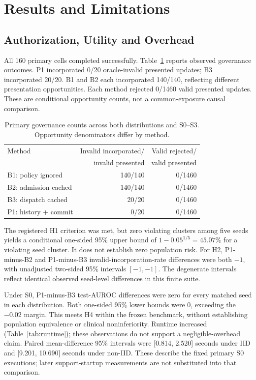 \documentclass[conference,letterpaper]{IEEEtran}
\begin{document}
\section{Results and Limitations}
\subsection{Authorization, Utility and Overhead}
All 160 primary cells completed successfully. Table~\ref{tab:governance} reports observed governance outcomes. P1 incorporated 0/20 oracle-invalid presented updates; B3 incorporated 20/20. B1 and B2 each incorporated 140/140, reflecting different presentation opportunities. Each method rejected 0/1460 valid presented updates. These are conditional opportunity counts, not a common-exposure causal comparison.

\begin{table}[t]
\caption{Primary governance counts across both distributions and S0--S3. Opportunity denominators differ by method.}
\label{tab:governance}
\centering
\begin{tabular}{lrr}
\toprule
Method & Invalid incorporated/ & Valid rejected/\\
       & invalid presented & valid presented\\
\midrule
B1: policy ignored & 140/140 & 0/1460\\
B2: admission cached & 140/140 & 0/1460\\
B3: dispatch cached & 20/20 & 0/1460\\
P1: history + commit & 0/20 & 0/1460\\
\bottomrule
\end{tabular}
\end{table}

The registered H1 criterion was met, but zero violating clusters among five seeds yields a conditional one-sided 95\% upper bound of $1-0.05^{1/5}=45.07\%$ for a violating seed cluster. It does not establish zero population risk. For H2, P1-minus-B2 and P1-minus-B3 invalid-incorporation-rate differences were both $-1$, with unadjusted two-sided 95\% intervals $[-1,-1]$. The degenerate intervals reflect identical observed seed-level differences in this finite suite.

Under S0, P1-minus-B3 test-AUROC differences were zero for every matched seed in each distribution. Both one-sided 95\% lower bounds were 0, exceeding the $-0.02$ margin. This meets H4 within the frozen benchmark, without establishing population equivalence or clinical noninferiority. Runtime increased (Table~\ref{tab:runtime}); these observations do not support a negligible-overhead claim. Paired mean-difference 95\% intervals were [0.814, 2.520] seconds under IID and [9.201, 10.690] seconds under non-IID. These describe the fixed primary S0 executions; later support-startup measurements are not substituted into that comparison.
\end{document}
